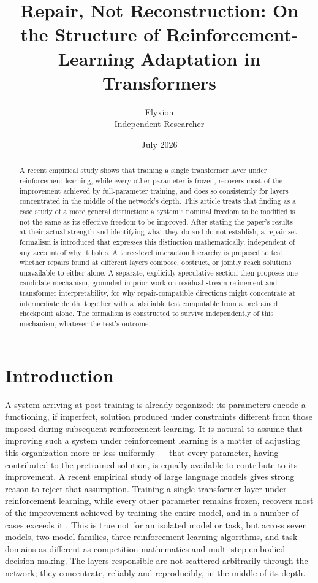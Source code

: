 \documentclass[11pt]{article}
\title{Repair, Not Reconstruction: On the Structure of Reinforcement-Learning Adaptation in Transformers}
\author{Flyxion \\ \small Independent Researcher}
\date{July 2026}
\begin{document}
\maketitle

\begin{abstract}
\noindent A recent empirical study shows that training a single transformer layer under reinforcement learning, while every other parameter is frozen, recovers most of the improvement achieved by full-parameter training, and does so consistently for layers concentrated in the middle of the network's depth. This article treats that finding as a case study of a more general distinction: a system's nominal freedom to be modified is not the same as its effective freedom to be improved. After stating the paper's results at their actual strength and identifying what they do and do not establish, a repair-set formalism is introduced that expresses this distinction mathematically, independent of any account of why it holds. A three-level interaction hierarchy is proposed to test whether repairs found at different layers compose, obstruct, or jointly reach solutions unavailable to either alone. A separate, explicitly speculative section then proposes one candidate mechanism, grounded in prior work on residual-stream refinement and transformer interpretability, for why repair-compatible directions might concentrate at intermediate depth, together with a falsifiable test computable from a pretrained checkpoint alone. The formalism is constructed to survive independently of this mechanism, whatever the test's outcome.
\end{abstract}

\section{Introduction}

A system arriving at post-training is already organized: its parameters encode a functioning, if imperfect, solution produced under constraints different from those imposed during subsequent reinforcement learning. It is natural to assume that improving such a system under reinforcement learning is a matter of adjusting this organization more or less uniformly --- that every parameter, having contributed to the pretrained solution, is equally available to contribute to its improvement. A recent empirical study of large language models gives strong reason to reject that assumption. Training a single transformer layer under reinforcement learning, while every other parameter remains frozen, recovers most of the improvement achieved by training the entire model, and in a number of cases exceeds it \cite{zhang2026onelayer}. This is true not for an isolated model or task, but across seven models, two model families, three reinforcement learning algorithms, and task domains as different as competition mathematics and multi-step embodied decision-making. The layers responsible are not scattered arbitrarily through the network; they concentrate, reliably and reproducibly, in the middle of its depth.
\end{document}
